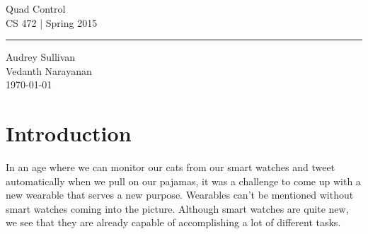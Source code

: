 \documentclass[12pt,letterpaper]{article}
\begin{document}
\begin{titlepage}
    \vspace*{4cm}
    \begin{flushright}
    {\huge
        Quad Control\\[5mm]
    }
    {\large
        CS 472 | Spring 2015
     }
    \end{flushright}
\hrule
    \begin{flushright}
	Audrey Sullivan\\
	Vedanth Narayanan\\
    \vfill
	\today\\
    \end{flushright}
\end{titlepage}

\raggedright

\section*{Introduction}
In an age where we can monitor our cats from our smart watches and tweet automatically when we pull on our pajamas, it was a challenge to come up with a new wearable that serves a new purpose. Wearables can’t be mentioned without smart watches coming into the picture. Although smart watches are quite new, we see that they are already capable of accomplishing a lot of different tasks.\\
\end{document}
